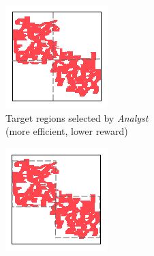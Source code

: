 \documentclass{tamuccthesis}
\begin{document}
\begin{figure}[H]
    \centering
    \begin{subfigure}[b]{0.475\textwidth}
        \centering
        \includegraphics[width=\textwidth]{quadtree_exA.png}
        \caption{Target regions selected by \textit{Analyst} \\ (more efficient, lower reward)}    
        \label{fig:quadtree_a}
    \end{subfigure}
    \hfill
    \begin{subfigure}[b]{0.475\textwidth}  
        \centering 
        \includegraphics[width=\textwidth]{quadtree_exB.png}

\end{subfigure}
\end{figure}
\end{document}
